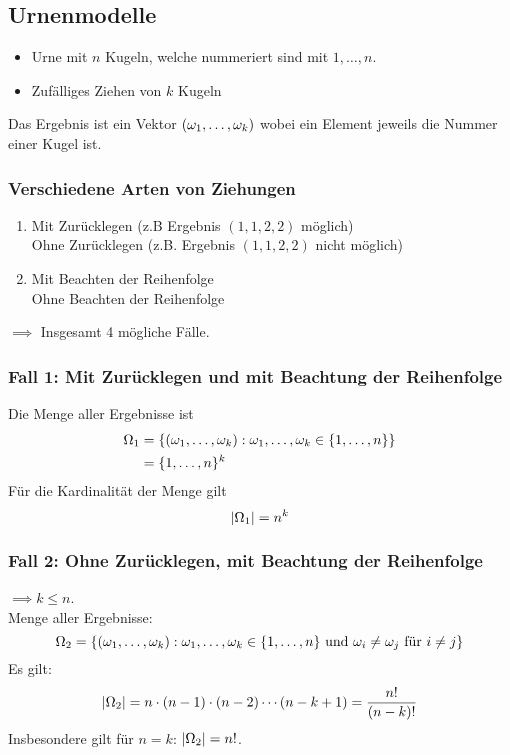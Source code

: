 \subsection{Urnenmodelle}
\begin{itemize}
    \item Urne mit $n$ Kugeln, welche nummeriert sind mit $1, \dots , n$.
    \item Zufälliges Ziehen von $k$ Kugeln
\end{itemize}
Das Ergebnis ist ein Vektor $(\omega_1,\dots , \omega_k)$ wobei ein Element jeweils die
Nummer einer Kugel ist.

\subsubsection{Verschiedene Arten von Ziehungen}
\begin{enumerate}
    \item Mit Zurücklegen (z.B Ergebnis $(1,1,2,2)$ möglich) \\
          Ohne Zurücklegen (z.B. Ergebnis $(1,1,2,2)$ nicht möglich)
    \item Mit Beachten der Reihenfolge\\
          Ohne Beachten der Reihenfolge
\end{enumerate}
$\implies$ Insgesamt 4 mögliche Fälle.

\subsubsection{Fall 1: Mit Zurücklegen und mit Beachtung der Reihenfolge}
Die Menge aller Ergebnisse ist
\begin{align*}
    \Omega_1 & = \{ (\omega_1, \dots ,\omega_k): \omega_1, \dots ,\omega_k \in \{1,\dots ,n\} \} \\
          & =\{ 1,\dots ,n \}^k
\end{align*}
Für die Kardinalität der Menge gilt
\begin{equation*}
    |\Omega_1| = n^k
\end{equation*}

\subsubsection{Fall 2: Ohne Zurücklegen, mit Beachtung der Reihenfolge}
$\implies k \leq n$.\\
Menge aller Ergebnisse:
\begin{equation*}
    \Omega_2 = \{ (\omega_1, \dots ,\omega_k): \omega_1, \dots ,\omega_k \in \{ 1, \dots ,n \} \text{ und } \omega_i \neq \omega_j \text{ für } i \neq j \}
\end{equation*}
Es gilt:
\begin{equation*}
    |\Omega_2| = n \cdot (n-1) \cdot (n-2) \cdots (n-k+1) = \frac{n!}{(n-k)!}
\end{equation*}
Insbesondere gilt für $n=k$: $|\Omega_2| = n!$.

